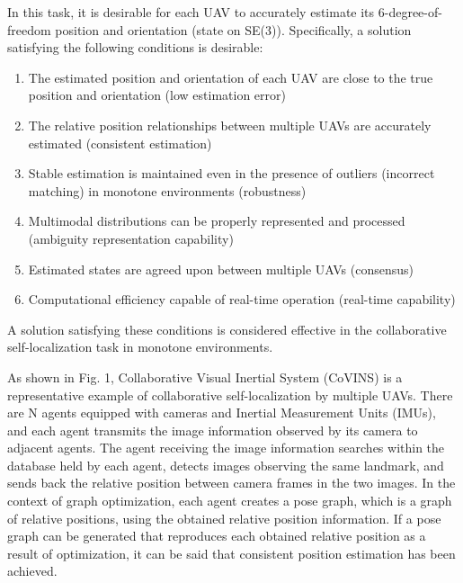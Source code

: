 \documentclass[a4paper,fleqn,10pt,twocolumn]{SICE_ISCS}
\begin{document}
In this task, it is desirable for each UAV to accurately estimate its 6-degree-of-freedom position and orientation (state on SE(3)). Specifically, a solution satisfying the following conditions is desirable:

\begin{enumerate}
\item The estimated position and orientation of each UAV are close to the true position and orientation (low estimation error)
\item The relative position relationships between multiple UAVs are accurately estimated (consistent estimation)
\item Stable estimation is maintained even in the presence of outliers (incorrect matching) in monotone environments (robustness)
\item Multimodal distributions can be properly represented and processed (ambiguity representation capability)
\item Estimated states are agreed upon between multiple UAVs (consensus)
\item Computational efficiency capable of real-time operation (real-time capability)
\end{enumerate}

A solution satisfying these conditions is considered effective in the collaborative self-localization task in monotone environments.

As shown in Fig. 1, Collaborative Visual Inertial System (CoVINS) is a representative example of collaborative self-localization by multiple UAVs. There are N agents equipped with cameras and Inertial Measurement Units (IMUs), and each agent transmits the image information observed by its camera to adjacent agents. The agent receiving the image information searches within the database held by each agent, detects images observing the same landmark, and sends back the relative position between camera frames in the two images. In the context of graph optimization, each agent creates a pose graph, which is a graph of relative positions, using the obtained relative position information. If a pose graph can be generated that reproduces each obtained relative position as a result of optimization, it can be said that consistent position estimation has been achieved.
\end{document}
